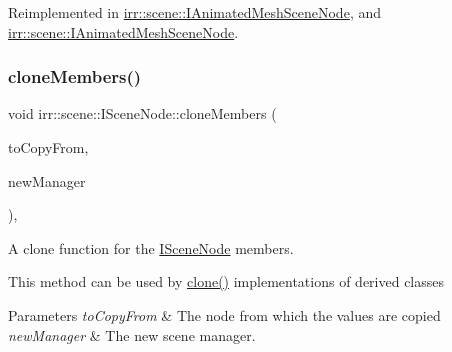 Reimplemented in \hyperlink{classirr_1_1scene_1_1IAnimatedMeshSceneNode_a47aabf6554e3f91bbb033edb8668cec8}{irr\+::scene\+::\+I\+Animated\+Mesh\+Scene\+Node}, and \hyperlink{classirr_1_1scene_1_1IAnimatedMeshSceneNode_a47aabf6554e3f91bbb033edb8668cec8}{irr\+::scene\+::\+I\+Animated\+Mesh\+Scene\+Node}.

\mbox{\label{classirr_1_1scene_1_1ISceneNode_a00a4ef0212b5d4b005202519859689bd}} 
\subsubsection{\texorpdfstring{clone\+Members()}{cloneMembers()}\hspace{0.1cm}{\footnotesize\ttfamily [1/2]}}
{\footnotesize\ttfamily void irr\+::scene\+::\+I\+Scene\+Node\+::clone\+Members (\begin{DoxyParamCaption}\item[{\hyperlink{classirr_1_1scene_1_1ISceneNode}{I\+Scene\+Node} $\ast$}]{to\+Copy\+From,  }\item[{\hyperlink{classirr_1_1scene_1_1ISceneManager}{I\+Scene\+Manager} $\ast$}]{new\+Manager }\end{DoxyParamCaption})\hspace{0.3cm}{\ttfamily [inline]}, {\ttfamily [protected]}}



A clone function for the \hyperlink{classirr_1_1scene_1_1ISceneNode}{I\+Scene\+Node} members. 

This method can be used by \hyperlink{classirr_1_1scene_1_1ISceneNode_ac39832b55855dc59196053adbaec95cc}{clone()} implementations of derived classes 
\begin{DoxyParams}{Parameters}
{\em to\+Copy\+From} & The node from which the values are copied \\
\hline
{\em new\+Manager} & The new scene manager. \\
\hline
\end{DoxyParams}
\mbox{\label{classirr_1_1scene_1_1ISceneNode_a00a4ef0212b5d4b005202519859689bd}} 
